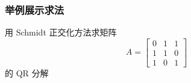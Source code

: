         \subsubsection{举例展示求法}
            \begin{problem}
                \par 用 Schmidt 正交化方法求矩阵
                \begin{equation*}
                    A = \begin{bmatrix}
                        0 & 1 & 1 \\ 1 & 1 & 0 \\ 1 & 0 & 1
                    \end{bmatrix}
                \end{equation*}
                的 QR 分解
            \end{problem}
